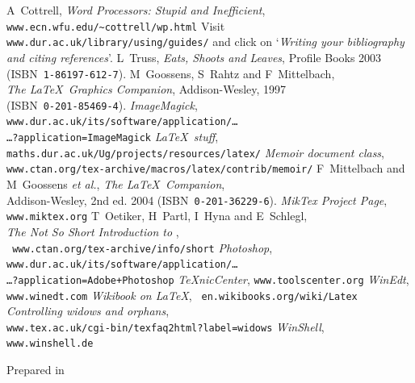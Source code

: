 \documentclass[a4paper,11pt]{report}
\newcommand\etal{\textsl{et al.}}
\newcommand\Quote[1]{\lq\textsl{#1}\rq}
\begin{document}

\begin{thebibliography}{9999}%
A~Cottrell, \textsl{Word Processors: Stupid and
Inefficient},
\\ \mbox{}\hfill\texttt{www.ecn.wfu.edu/\~{}cottrell/wp.html}
Visit \texttt{www.dur.ac.uk/library/using/guides/}
and click on \Quote{Writing your bibliography and citing references}.
L~Truss, \textsl{Eats, Shoots and Leaves}, Profile
  Books 2003\\ \mbox{}\hfill(ISBN~\texttt{1-86197-612-7}).
M~Goossens, S~Rahtz and F~Mittelbach,\\
  \mbox{}\hfill \textsl{The \LaTeX\ Graphics Companion},
  Addison-Wesley, 1997\\  \mbox{}\hfill(ISBN~\texttt{0-201-85469-4}).
 \textsl{ImageMagick}, {\tt%
www.dur.ac.uk/its/software/application/\dots
\\ \mbox{}\hfill\dots?application=ImageMagick}
 \textsl{\LaTeX\ stuff},
	\texttt{maths.dur.ac.uk/Ug/projects/resources/latex/}
 \textsl{Memoir document class},\\ \mbox{}\hfill
   \texttt{www.ctan.org/tex-archive/macros/latex/contrib/memoir/}
F~Mittelbach and M~Goossens \etal, \textsl{The
\LaTeX\ Companion},\\  \mbox{}\hfill Addison-Wesley, 2nd ed. 2004
(ISBN~\texttt{0-201-36229-6}).
 \textsl{MikTex Project Page}, \texttt{www.miktex.org}
T~Oetiker, H~Partl, I~Hyna and E~Schlegl,\\
\mbox{}\hfill
\textsl{The Not So Short Introduction to \LaTeXe},\\ \mbox{}\hfill{\tt
www.ctan.org/tex-archive/info/short}
 \textsl{Photoshop}, {\tt%
www.dur.ac.uk/its/software/application/\dots
\\ \mbox{}\hfill\dots?application=Adobe+Photoshop}
 \textsl{TeXnicCenter}, \texttt{www.toolscenter.org}
 \textsl{WinEdt}, \texttt{www.winedt.com}
 \textsl{Wikibook on \LaTeX}, \texttt{%
	en.wikibooks.org/wiki/Latex}
 \textsl{Controlling widows and orphans}, 
\\ \mbox{}\hfill\texttt{www.tex.ac.uk/cgi-bin/texfaq2html?label=widows}
 \textsl{WinShell}, \texttt{www.winshell.de}
\end{thebibliography}
\vfill
\begin{flushright}\small Prepared in \LaTeXe\ \end{flushright}

\appendix





\end{document}
